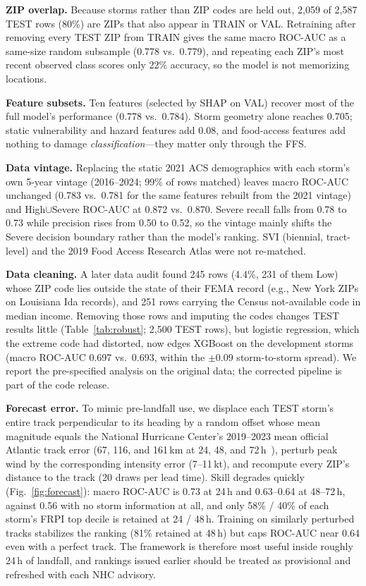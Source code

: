 \documentclass[conference]{IEEEtran}
\renewcommand{\_}{\origunderscore\allowbreak}
\begin{document}
\textbf{ZIP overlap.} Because storms rather than ZIP codes are
held out, 2,059 of 2,587 TEST rows (80\%) are ZIPs that also
appear in TRAIN or VAL. Retraining after removing every TEST ZIP
from TRAIN gives the same macro ROC-AUC as a same-size random
subsample (0.778 vs.\ 0.779), and repeating each ZIP's most
recent observed class scores only 22\% accuracy, so the model is
not memorizing locations.

\textbf{Feature subsets.} Ten features (selected by SHAP on VAL)
recover most of the full model's performance (0.778 vs.\ 0.784).
Storm geometry alone reaches 0.705; static vulnerability and
hazard features add 0.08, and food-access features add nothing to
damage \textit{classification}---they matter only through the FFS.

\textbf{Data vintage.} Replacing the static 2021 ACS demographics
with each storm's own 5-year vintage (2016--2024; 99\% of rows
matched) leaves macro ROC-AUC unchanged (0.783 vs.\ 0.781 for the
same features rebuilt from the 2021 vintage) and High$\cup$Severe
ROC-AUC at 0.872 vs.\ 0.870. Severe recall falls from 0.78 to 0.73
while precision rises from 0.50 to 0.52, so the vintage mainly
shifts the Severe decision boundary rather than the model's
ranking. SVI (biennial, tract-level) and the 2019 Food Access
Research Atlas were not re-matched.

\textbf{Data cleaning.} A later data audit found 245 rows (4.4\%,
231 of them Low) whose ZIP code lies outside the state of their
FEMA record (e.g., New York ZIPs on Louisiana Ida records), and 251
rows carrying the Census not-available code in median income.
Removing those rows and imputing the codes changes TEST results
little (Table~\ref{tab:robust}; 2,500 TEST rows), but logistic
regression, which the extreme code had distorted, now edges XGBoost
on the development storms (macro ROC-AUC 0.697 vs.\ 0.693, within
the $\pm$0.09 storm-to-storm spread). We report the pre-specified
analysis on the original data; the corrected pipeline is part of
the code release.

\textbf{Forecast error.} To mimic pre-landfall use, we displace
each TEST storm's entire track perpendicular to its heading by a
random offset whose mean magnitude equals the National Hurricane
Center's 2019--2023 mean official Atlantic track error (67, 116,
and 161\,km at 24, 48, and 72\,h~\cite{nhc_verification}), perturb
peak wind by the corresponding intensity error (7--11\,kt), and
recompute every ZIP's distance to the track (20 draws per lead
time). Skill degrades quickly (Fig.~\ref{fig:forecast}): macro ROC-AUC is 0.73 at 24\,h and
0.63--0.64 at 48--72\,h, against 0.56 with no storm information at all,
and only 58\% / 40\% of each storm's FRPI top decile is retained
at 24 / 48\,h. Training on similarly perturbed tracks stabilizes
the ranking (81\% retained at 48\,h) but caps ROC-AUC near 0.64
even with a perfect track. The framework is therefore most useful
inside roughly 24\,h of landfall, and rankings issued earlier
should be treated as provisional and refreshed with each NHC
advisory.
\end{document}
